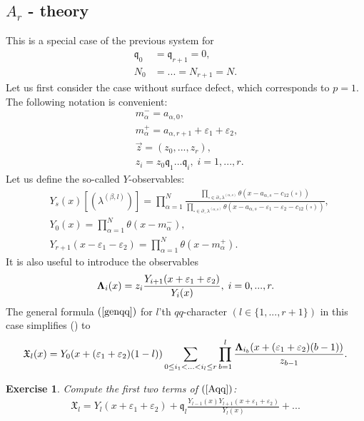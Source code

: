 \documentclass[12pt]{article}
\newtheorem{exer}{Exercise}[section]
\numberwithin{equation}{section}
\theoremstyle{definition}
\begin{document}
\subsection{$A_{r}$ - theory}
This is a special case of the previous system for
\begin{align*}
    \mathfrak{q}_{0} &= \mathfrak{q}_{r+1} = 0,\\
    N_{0} &= ... = N_{r+1} = N.
\end{align*}
Let us first consider the case without surface defect, which corresponds to $p = 1$. The following notation is convenient:
\begin{align*}
    &m_{\alpha}^{-} = a_{\alpha, 0},\\
    &m_{\alpha}^{+} = a_{\alpha, r+1} + \varepsilon_{1} + \varepsilon_{2},\\
    &\vec{z} = (z_0, ..., z_{r}), \\
    &z_{i} = z_0 \mathfrak{q}_{1} ... \mathfrak{q}_{i}, \; i = 1, ..., r.
\end{align*}
Let us define the so-called $Y$-observables:
\begin{align*}
 &Y_{s}(x)[(\lambda^{(\beta, l)})] = \prod\limits_{\alpha = 1}^{N} \frac{\prod\limits_{\square \in \partial_{+}\lambda^{(\alpha, s)}} \theta (x - a_{\alpha, s} - c_{12}(\square))}{\prod\limits_{\square \in \partial_{-}\lambda^{(\alpha, s)}} \theta (x - a_{\alpha, s} - \varepsilon_1 - \varepsilon_2 - c_{12}(\square))},\\
      &Y_{0}(x) = \prod\limits_{\alpha = 1}^{N} \theta(x - m_{\alpha}^{-}),\\
    &Y_{r+1}(x-\varepsilon_1 - \varepsilon_2 ) = \prod\limits_{\alpha = 1}^{N}\theta (x - m_{\alpha}^{+}).
\end{align*}
It is also useful to introduce the observables
\begin{align*}
    \bold{\Lambda}_{i}(x) = z_{i} \frac{Y_{i+1}(x + \varepsilon_1 + \varepsilon_2)}{Y_{i}(x)}, \; i = 0, ..., r.
\end{align*}
The general formula $(\ref{genqq})$ for $l$'th $qq$-character $(l \in \{1, ..., r+1\})$ in this case simplifies (\cite{Nekrasov2015BPSCFTCN}) to
\begin{align}\label{Aqq}
    \mathfrak{X}_{l}(x) = Y_{0}(x + (\varepsilon_1 + \varepsilon_2 )(1-l))\sum\limits_{0 \leq i_1 < ... <i_{l} \leq r} \prod\limits_{b = 1}^{l} \frac{\bold{\Lambda}_{i_{b}}(x + (\varepsilon_1 + \varepsilon_2 )(b-1))}{z_{b - 1}}.
\end{align}
\begin{exer}
    Compute the first two terms of $(\ref{Aqq})$:
    \begin{align*}
        \mathfrak{X}_{l} = Y_{l}(x + \varepsilon_1 + \varepsilon_2 ) + \mathfrak{q}_{l}\frac{Y_{l-1}(x)Y_{l+1}(x + \varepsilon_1 + \varepsilon_2)}{Y_{l}(x)}+...
    \end{align*}
\end{exer}
\end{document}

